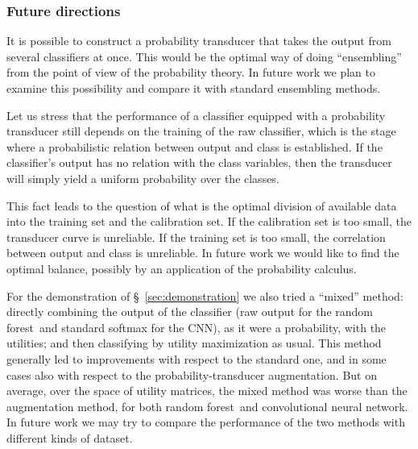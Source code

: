 \documentclass[\ifafour a4paper,12pt,\else a5paper,10pt,\fi%
onecolumn,oneside,article,%
british%
]{memoir}
\theoremstyle{remark}
\theoremstyle{innote}
\newcommand*{\wrench}{{\fontencoding{U}\fontfamily{fontawesomethree}\selectfont\symbol{114}}}
\newcommand{\mynotew}[1]{{\footnotesize\color{notecolour}\wrench\ #1}}
\renewcommand*{\|}[1][]{\nonscript\:#1\vert\nonscript\:\mathopen{}}
\newcommand*{\sect}{\S}%
\newcommand*{\RF}{random forest}
\newcommand*{\CNN}{convolutional neural network}
\begin{document}
\subsubsection{Future directions}
\label{sec:future}

It is possible to construct a probability transducer that takes the output from several classifiers at once. This would be the optimal way of doing \enquote{ensembling} from the point of view of the probability theory. In future work we plan to examine this possibility and compare it with standard ensembling methods.

Let us stress that the performance of a classifier equipped with a probability transducer still depends on the training of the raw classifier, which is the stage where a probabilistic relation between output and class is established. If the classifier's output has no relation with the class variables, then the transducer will simply yield a uniform probability over the classes.

This fact leads to the question of what is the optimal division of available data into the training set and the calibration set. If the calibration set is too small, the transducer curve is unreliable. If the training set is too small, the correlation between output and class is unreliable. In future work we would like to find the optimal balance, possibly by an application of the probability calculus.

For the demonstration of \sect~\ref{sec:demonstration} we also tried a \enquote{mixed} method: directly combining the output of the classifier (raw output for the \RF\ and standard softmax for the CNN), as it were a probability, with the utilities; and then classifying by utility maximization as usual. This method generally led to improvements with respect to the standard one, and in some cases also with respect to the probability-transducer augmentation. But on average, over the space of utility matrices, the mixed method was worse than the augmentation method, for both \RF\ and \CNN. In future work we may try to compare the performance of the two methods with different kinds of dataset.







\end{document}
